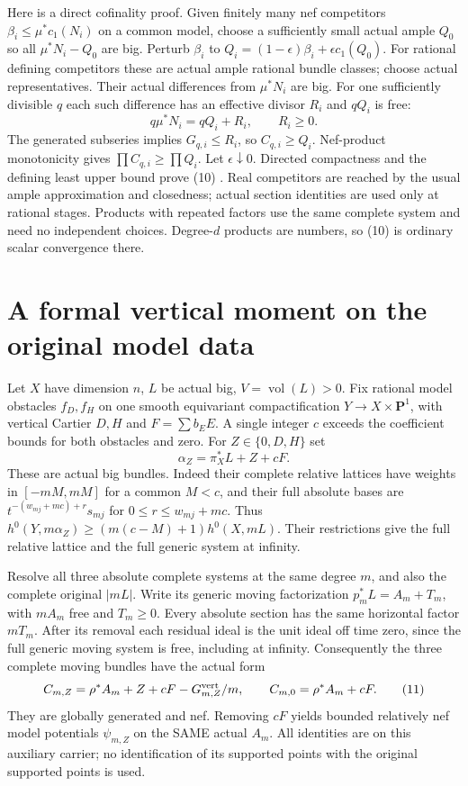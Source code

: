 \documentclass[10pt]{article}
\newcommand{\vol}{\operatorname{vol}}
\begin{document}
Here is a direct cofinality proof. Given finitely many nef competitors
$\beta_i\le\mu^*c_1(N_i)$ on a common model, choose a sufficiently
small actual ample $Q_0$ so all $\mu^*N_i-Q_0$ are big. Perturb
$\beta_i$ to $Q_i=(1-\epsilon)\beta_i+\epsilon c_1(Q_0)$.
For rational defining competitors these are actual ample rational
bundle classes; choose actual representatives. Their actual differences
from $\mu^*N_i$ are big. For one sufficiently divisible $q$ each such
difference has an effective divisor $R_i$ and $qQ_i$ is free:
\[
 q\mu^*N_i=qQ_i+R_i,\qquad R_i\ge0.
\]
The generated subseries implies $G_{q,i}\le R_i$, so $C_{q,i}\ge Q_i$.
Nef-product monotonicity gives $\prod C_{q,i}\ge\prod Q_i$.
Let $\epsilon\downarrow0$. Directed compactness and the defining least
upper bound prove (10) \cite{BFJ}. Real competitors are reached by the
usual ample approximation and closedness; actual section identities
are used only at rational stages. Products with repeated factors use
the same complete system and need no independent choices. Degree-$d$
products are numbers, so (10) is ordinary scalar convergence there.

\section{A formal vertical moment on the original model data}
Let $X$ have dimension $n$, $L$ be actual big, $V=\vol(L)>0$.
Fix rational model obstacles $f_D,f_H$ on one smooth equivariant
compactification $Y\to X\times\mathbf P^1$, with vertical Cartier
$D,H$ and $F=\sum b_EE$. A single integer $c$ exceeds the coefficient
bounds for both obstacles and zero. For $Z\in\{0,D,H\}$ set
\[
 \alpha_Z=\pi_X^*L+Z+cF.
\]
These are actual big bundles. Indeed their complete relative lattices
have weights in $[-mM,mM]$ for a common $M<c$, and their full absolute
bases are $t^{-(w_{mj}+mc)+r}s_{mj}$ for $0\le r\le w_{mj}+mc$.
Thus $h^0(Y,m\alpha_Z)\ge(m(c-M)+1)h^0(X,mL)$.
Their restrictions give the full relative lattice and the full generic
system at infinity.

Resolve all three absolute complete systems at the same degree $m$,
and also the complete original $|mL|$. Write its generic moving
factorization $p_m^*L=A_m+T_m$, with $mA_m$ free and $T_m\ge0$.
Every absolute section has the same horizontal factor $mT_m$.
After its removal each residual ideal is the unit ideal off time zero,
since the full generic moving system is free, including at infinity.
Consequently the three complete moving bundles have the actual form
\[
 C_{m,Z}=\rho^*A_m+Z+cF-G_{m,Z}^{\rm vert}/m,
       \qquad C_{m,0}=\rho^*A_m+cF.                    \tag{11}
\]
They are globally generated and nef. Removing $cF$ yields bounded
relatively nef model potentials $\psi_{m,Z}$ on the SAME actual $A_m$.
All identities are on this auxiliary carrier; no identification of its
supported points with the original supported points is used.
\end{document}
